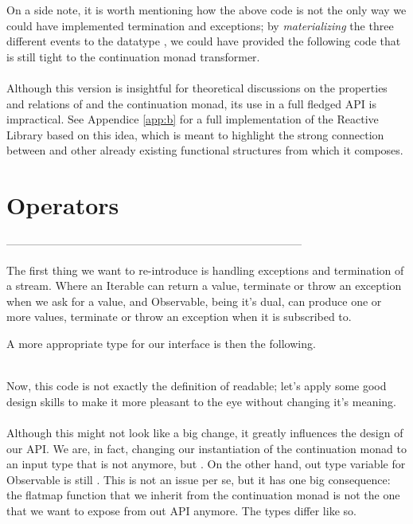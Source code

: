 On a side note, it is worth mentioning how the above code is not the only way we could have implemented termination and exceptions; by \textit{materializing} the three different events to the datatype , we could have provided the following code that is still tight to the continuation monad transformer.\\

\\

Although this version is insightful for theoretical discussions on the properties and relations of  and the continuation monad, its use in a full fledged API is impractical. See Appendice \ref{app:b} for a full implementation of the Reactive Library based on this idea, which is meant to highlight the strong connection between  and other already existing functional structures from which it composes. 

\section{Operators}

--------------------------------------------------------------------------------

The first thing we want to re-introduce is handling exceptions and termination of a stream. Where an Iterable can return a value, terminate or throw an exception when we ask for a value, and Observable, being it's dual, can produce one or more values, terminate or throw an exception when it is subscribed to. 

A more appropriate type for our interface is then the following.\\

\\


Now, this code is not exactly the definition of readable; let's apply some good design skills to make it more pleasant to the eye without changing it's meaning.\\

\\

Although this might not look like a big change, it greatly influences the design of our API. We are, in fact, changing our instantiation of the continuation monad to an input type that is not  anymore, but . On the other hand, out type variable for Observable is still . This is not an issue per se, but it has one big consequence: the flatmap function that we inherit from the continuation monad is not the one that we want to expose from out API anymore. The types differ like so.\\

